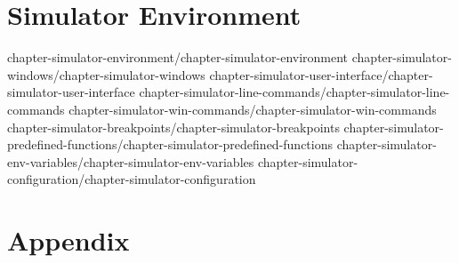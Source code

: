 \documentclass[a4paper, 11pt, openright]{book}
\begin{document}
\part{Simulator Environment}
 {chapter-simulator-environment/chapter-simulator-environment}
 {chapter-simulator-windows/chapter-simulator-windows}
 {chapter-simulator-user-interface/chapter-simulator-user-interface}
 {chapter-simulator-line-commands/chapter-simulator-line-commands}
 {chapter-simulator-win-commands/chapter-simulator-win-commands}
 {chapter-simulator-breakpoints/chapter-simulator-breakpoints}
 {chapter-simulator-predefined-functions/chapter-simulator-predefined-functions}
 {chapter-simulator-env-variables/chapter-simulator-env-variables}
 {chapter-simulator-configuration/chapter-simulator-configuration}

\part{Appendix}










\backmatter
\end{document}
